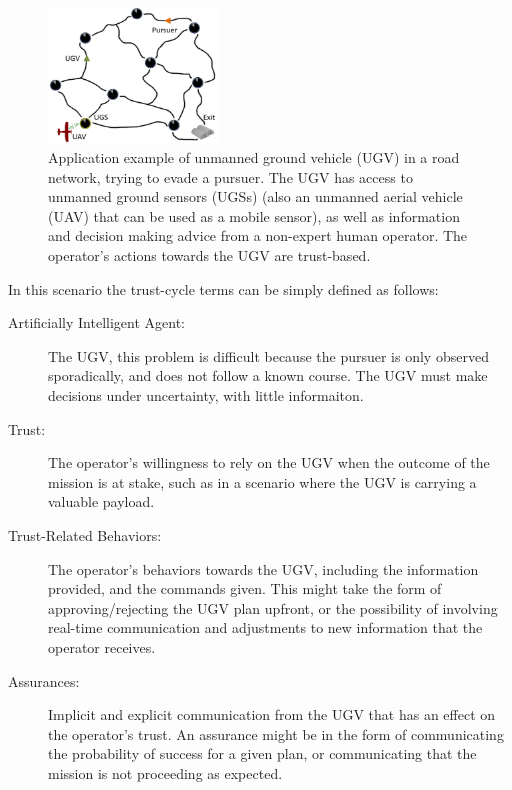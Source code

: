 	\begin{figure}[htbp]
    	\centering
     	\includegraphics[width=0.4\textwidth]{Figures/RoadNet}
    	\caption{Application example of unmanned ground vehicle (UGV) in a road network, trying to evade a pursuer. The UGV has access to unmanned ground sensors (UGSs) (also an unmanned aerial vehicle (UAV) that can be used as a mobile sensor), as well as information and decision making advice from a non-expert human operator. The operator's actions towards the UGV are trust-based.}
        \label{fig:RoadNet}
    \end{figure}

    In this scenario the trust-cycle terms can be simply defined as follows:

    \begin{description}
        \item [Artificially Intelligent Agent:] The UGV, this problem is difficult because the pursuer is only observed sporadically, and does not follow a known course. The UGV must make decisions under uncertainty, with little informaiton. 
        \item [Trust:] The operator's willingness to rely on the UGV when the outcome of the mission is at stake, such as in a scenario where the UGV is carrying a valuable payload.
        \item [Trust-Related Behaviors:] The operator's behaviors towards the UGV, including the information provided, and the commands given. This might take the form of approving/rejecting the UGV plan upfront, or the possibility of involving real-time communication and adjustments to new information that the operator receives.
        \item [Assurances:] Implicit and explicit communication from the UGV that has an effect on the operator's trust. An assurance might be in the form of communicating the probability of success for a given plan, or communicating that the mission is not proceeding as expected.
    \end{description}

